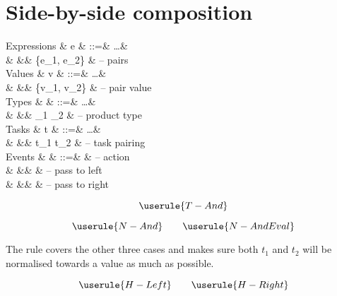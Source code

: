 
\section{Side-by-side composition}


\begin{grammar}
  Expressions
    & e    & ::=& \ldots               & \\
    &      &\mid& \{e_1, e_2\}         & – pairs \\
  Values
    & v    & ::=& \ldots               & \\
    &      &\mid& \{v_1, v_2\}         & – pair value \\
  Types
    & \tau & ::=& \ldots               & \\
    &      &\mid& \tau_1 \times \tau_2 & – product type \\
  Tasks
    & t    & ::=& \ldots               & \\
    &      &\mid& t_1 \And t_2         & – task pairing \\
  Events
    & \eta & ::=& \alpha               & – action \\
    &      &\mid& \Left \eta           & – pass to left \\
    &      &\mid& \Right \eta          & – pass to right \\
\end{grammar}

\begin{equation*}
  \userule{T-And}
\end{equation*}

\begin{equation*}
  \userule{N-And} \qquad \userule{N-AndEval}
\end{equation*}

The rule  covers the other three cases and makes sure both $t_1$ and $t_2$ will be normalised towards a value as much as possible.

\renewcommand*{\AndOr}{\And}

\begin{equation*}
  \userule{H-Left} \qquad \userule{H-Right}
\end{equation*}

